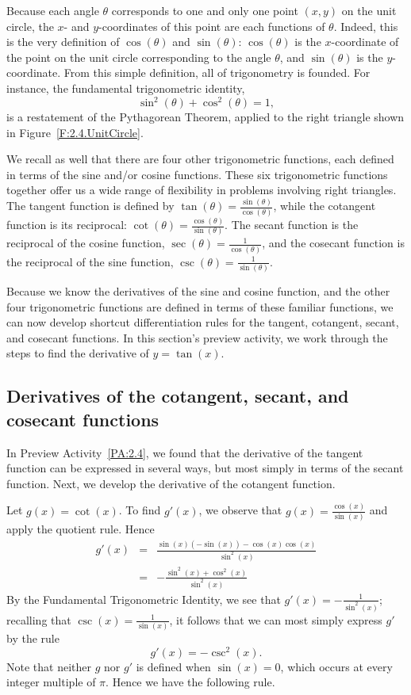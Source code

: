 Because each angle $\theta$ corresponds to one and only one point $(x,y)$ on the unit circle, the $x$- and $y$-coordinates of this point are each functions of $\theta$.  Indeed, this is the very definition of $\cos(\theta)$ and $\sin(\theta)$: $\cos(\theta)$ is the $x$-coordinate of the point on the unit circle corresponding to the angle $\theta$, and $\sin(\theta)$ is the $y$-coordinate.  From this simple definition, all of trigonometry is founded.  For instance, the fundamental trigonometric identity,
$$\sin^2(\theta) + \cos^2(\theta) = 1,$$
is a restatement of the Pythagorean Theorem, applied to the right triangle shown in Figure~\ref{F:2.4.UnitCircle}.

We recall as well that there are four other trigonometric functions, each defined in terms of the sine and/or cosine functions.  These six trigonometric functions together offer us a wide range of flexibility in problems involving right triangles.  The tangent function  is defined by $\tan(\theta) = \frac{\sin(\theta)}{\cos(\theta)}$, while the cotangent function is its reciprocal:  $\cot(\theta) = \frac{\cos(\theta)}{\sin(\theta)}$.  The secant function is the reciprocal of the cosine function, $\sec(\theta) = \frac{1}{\cos(\theta)}$, and the cosecant function is the reciprocal of the sine function, $\csc(\theta) = \frac{1}{\sin(\theta)}$.  

Because we know the derivatives of the sine and cosine function, and the other four trigonometric functions are defined in terms of these familiar functions, we can now develop shortcut differentiation rules for the tangent, cotangent, secant, and cosecant functions.  In this section's preview activity, we work through the steps to find the derivative of $y = \tan(x)$.



\subsection*{Derivatives of the cotangent, secant, and cosecant functions}   

In Preview Activity~\ref{PA:2.4}, we found that the derivative of the tangent function can be expressed in several ways, but most simply in terms of the secant function.  Next, we develop the derivative of the cotangent function.

Let $g(x) = \cot(x)$.  To find $g'(x)$, we observe that $g(x) = \frac{\cos(x)}{\sin(x)}$ and apply the quotient rule.  Hence
\begin{eqnarray*}
	g'(x) & = & \frac{\sin(x)(-\sin(x)) - \cos(x) \cos(x)}{\sin^2(x)} \\
	        & = & -\frac{\sin^2(x) + \cos^2(x)}{\sin^2(x)}
\end{eqnarray*}
By the Fundamental Trigonometric Identity, we see that $g'(x) = -\frac{1}{\sin^2(x)}$; recalling that $\csc(x) = \frac{1}{\sin(x)}$, it follows that we can most simply express $g'$ by the rule
$$g'(x) = -\csc^2(x).$$
Note that neither $g$ nor $g'$ is defined when $\sin(x) = 0$, which occurs at every integer multiple of $\pi$.  Hence we have the following rule.

